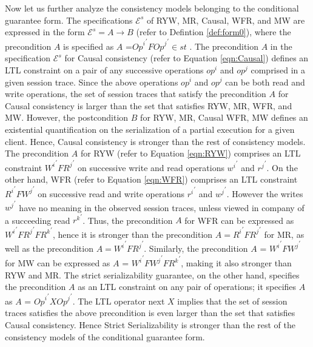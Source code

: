 \documentclass{sig-alternate-05-2015}
\begin{document}
 \par Now let us further analyze the consistency models belonging to the conditional guarantee form. The specifications $\mathcal{E}^{s} $ of RYW, MR, Causal, WFR, and MW are expressed in the form  $\mathcal{E}^{s} = A \rightarrow B$ (refer to Defintion \ref{def:form0}), where the precondition $A$ is specified as $A$ =$ {\mathit{Op}^i}^{'} F {\mathit{Op}^j}^{'} \in \mathit{st} $ .  The precondition $A$  in the specification $\mathcal{E}^{s} $ for Causal consistency  (refer to Equation \ref{eqn:Causal}) defines an LTL constraint  on a pair of any successive operations $ {\mathit{op}^i}$ and  ${\mathit{op}^j}$  comprised in a given session trace.  Since the above operations $ {\mathit{op}^i}$ and  ${\mathit{op}^j}$ can be both read and write operations, the set of session traces that satisfy the precondition $A$ for Causal consistency is larger  than the set that satisfies RYW, MR, WFR, and MW. However, the postcondition $B$ for RYW, MR, Causal WFR, MW defines an existential quantification on the serialization of a partial execution for a given client.  Hence, Causal consistency is stronger than the rest of consistency models.  The precondition $A$ for RYW (refer to Equation \ref{eqn:RYW}) comprises an LTL constraint ${W^i}^{'} F {R^j}^{'}$ on successive write and read operations ${w^i}^{'}$ and ${r^j}^{'}$.  On the other hand, WFR (refer to Equation \ref{eqn:WFR}) comprises an LTL constraint ${R^i}^{'} F {W^j}^{'}$ on successive read and write operations ${r^i}^{'}$ and ${w^j}^{'}$. However the writes ${w^j}^{'}$ have no meaning in the observed session traces, unless viewed in company of a succeeding read  ${r^k}^{'}$.  Thus, the precondition $A$ for WFR can be expressed as ${W^i}^{'} F {R^j}^{'} F {R^k}^{'}$, hence it is stronger than the precondition $A = {R^i}^{'} F {R^j}^{'}$ for MR, as well as the precondition $A = {W^i}^{'} F {R^j}^{'}$. Similarly, the precondition $A$ =  ${W^i}^{'} F {W^j}^{'}$  for MW can be expressed as   $A$ =  ${W^i}^{'} F {W^j}^{'} F {R^k}^{'} $, making it also stronger than RYW and MR.  The strict serializability guarantee, on the other hand, specifies the precondition $A$ as an LTL constraint on any pair of operations; it specifies $A$ as  $A$ =  ${\mathit{Op}^i}^{'} X {\mathit{Op}^j}^{'}$. The LTL operator next $X$ implies that the set of session traces satisfies the above precondition is even larger than the set that satisfies Causal consistency. Hence Strict Serializability is stronger than the rest of the consistency models of the conditional guarantee form. 
\end{document}
